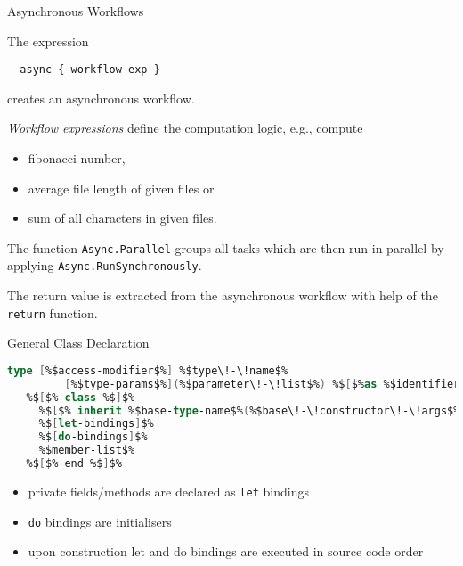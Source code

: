 \documentclass{beamer}
\begin{document}
\begin{frame}[fragile]{Asynchronous Workflows}

The expression
\color{blue}
\begin{lstlisting}
  async { workflow-exp }
\end{lstlisting}
\color{black}

creates an asynchronous workflow. 

\medskip

\emph{Workflow expressions} define the computation logic, e.g.,
compute 
\begin{itemize}
\item fibonacci number,
\item average file length of given files or
\item sum of all characters in given files. 
\end{itemize}

\medskip

The function \lstinline!Async.Parallel! groups all tasks which are
then run in parallel by applying \lstinline!Async.RunSynchronously!.

\medskip

The return value is extracted from the asynchronous workflow with help
of the \lstinline!return! function.

\end{frame}





\appendix

\begin{frame}[fragile]{General Class Declaration}

\begin{lstlisting}[language=FSharp, escapechar=\%]
type [%$access-modifier$%] %$type\!-\!name$% 
         [%$type-params$%](%$parameter\!-\!list$%) %$[$%as %$identifier]$% =
   %$[$% class %$]$%
     %$[$% inherit %$base-type-name$%(%$base\!-\!constructor\!-\!args$%) %]%
     %$[let-bindings]$%
     %$[do-bindings]$%
     %$member-list$%
   %$[$% end %$]$%
\end{lstlisting}

\begin{itemize}
  \item private fields/methods are declared as \lstinline{let} bindings
  \item \lstinline!do! bindings are initialisers
  \item upon construction let and do bindings are executed in source code order
\end{itemize}
\end{frame}
\end{document}

